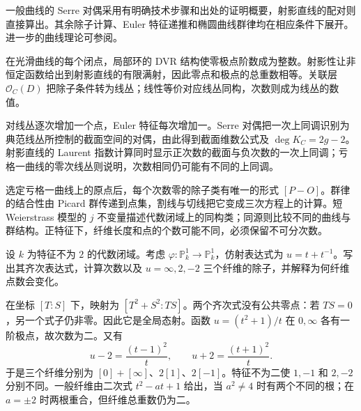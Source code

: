\ProseParagraphBreak
一般曲线的 Serre 对偶采用有明确技术步骤和出处的证明概要，射影直线的配对则直接算出。其余除子计算、Euler 特征递推和椭圆曲线群律均在相应条件下展开。进一步的曲线理论可参阅\cite[Chapter IV, Sections 1--4]{Hartshorne1977}。






\begin{chaptersummary}
	在光滑曲线的每个闭点，局部环的 DVR 结构使零极点阶数成为整数。射影性让非恒定函数给出到射影直线的有限满射，因此零点和极点的总重数相等。关联层 \(\mathcal O_C(D)\) 把除子条件转为线丛；线性等价对应线丛同构，次数则成为线丛的数值。

	\ProseParagraphBreak
	对线丛逐次增加一个点，Euler 特征每次增加一。Serre 对偶把一次上同调识别为典范线丛所控制的截面空间的对偶，由此得到截面维数公式及 \(\deg K_C=2g-2\)。射影直线的 Laurent 指数计算同时显示正次数的截面与负次数的一次上同调；亏格一曲线的零次线丛则说明，次数相同仍可能有不同的上同调。

	\ProseParagraphBreak
	选定亏格一曲线上的原点后，每个次数零的除子类有唯一的形式 \([P-O]\)。群律的结合性由 Picard 群传递到点集，割线与切线把它变成三次方程上的计算。短 Weierstrass 模型的 \(j\) 不变量描述代数闭域上的同构类；同源则比较不同的曲线与群结构。正特征下，纤维长度和点的个数可能不同，必须保留不可分次数。
\end{chaptersummary}

\BookExercises

\begin{exercise}\label{b3:ex:H-rational-double-cover}
	设 \(k\) 为特征不为 \(2\) 的代数闭域。考虑 \(\varphi:\mathbb P_k^1\rightarrow\mathbb P_k^1\)，仿射表达式为 \(u=t+t^{-1}\)。写出其齐次表达式，计算次数以及 \(u=\infty,2,-2\) 三个纤维的除子，并解释为何纤维点数会变化。
\end{exercise}
\begin{solution}
	在坐标 \([T:S]\) 下，映射为 \([T^2+S^2:TS]\)。两个齐次式没有公共零点：若 \(TS=0\)，另一个式子仍非零。因此它是全局态射。函数 \(u=(t^2+1)/t\) 在 \(0,\infty\) 各有一阶极点，故次数为二。又有
	\[
		u-2=\frac{(t-1)^2}{t},\qquad u+2=\frac{(t+1)^2}{t}.
	\]
	于是三个纤维分别为 \([0]+[\infty]\)、\(2[1]\)、\(2[-1]\)。特征不为二使 \(1,-1\) 和 \(2,-2\) 分别不同。一般纤维由二次式 \(t^2-at+1\) 给出，当 \(a^2\ne4\) 时有两个不同的根；在 \(a=\pm2\) 时两根重合，但纤维总重数仍为二。
\end{solution}

